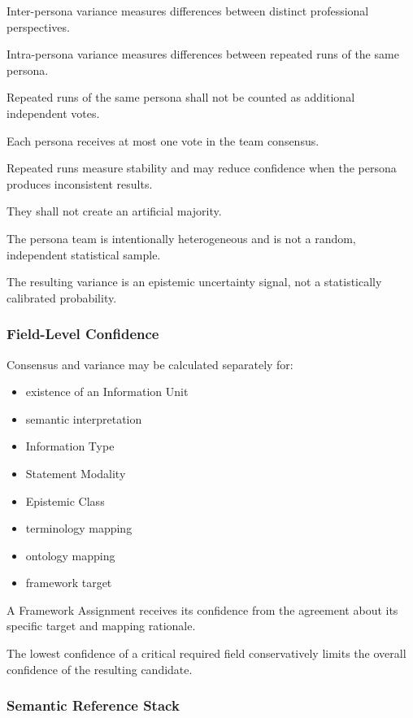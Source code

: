 Inter-persona variance measures differences between distinct professional perspectives.

Intra-persona variance measures differences between repeated runs of the same persona.

Repeated runs of the same persona shall not be counted as additional independent votes.

Each persona receives at most one vote in the team consensus.

Repeated runs measure stability and may reduce confidence when the persona produces inconsistent results.

They shall not create an artificial majority.

The persona team is intentionally heterogeneous and is not a random, independent statistical sample.

The resulting variance is an epistemic uncertainty signal, not a statistically calibrated probability.

\hypertarget{field-level-confidence}{%
\subsubsection{Field-Level Confidence}\label{field-level-confidence}}

Consensus and variance may be calculated separately for:

\begin{itemize}
\tightlist
\item
  existence of an Information Unit
\item
  semantic interpretation
\item
  Information Type
\item
  Statement Modality
\item
  Epistemic Class
\item
  terminology mapping
\item
  ontology mapping
\item
  framework target
\end{itemize}

A Framework Assignment receives its confidence from the agreement about its specific target and mapping rationale.

The lowest confidence of a critical required field conservatively limits the overall confidence of the resulting candidate.

\hypertarget{semantic-reference-stack}{%
\subsubsection{Semantic Reference Stack}\label{semantic-reference-stack}}

